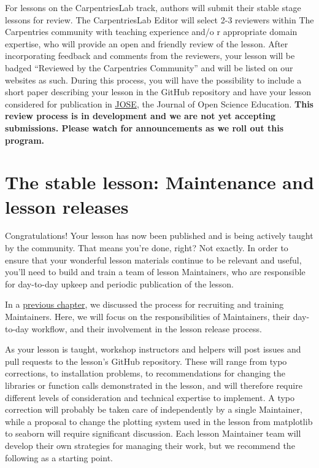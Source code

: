 \documentclass[]{book}
\begin{document}
For lessons on the CarpentriesLab track, authors will submit their stable stage lessons for review.
The CarpentriesLab Editor will select 2-3 reviewers within The Carpentries community with teaching experience and/o
r appropriate domain expertise, who will provide an open and friendly review of the lesson.
After incorporating feedback and comments from the reviewers, your lesson will be badged
``Reviewed by the Carpentries Community'' and will be listed on our websites as such. During this process,
you will have the possibility to include a short paper describing your
lesson in the GitHub repository and have your lesson considered for publication in
\href{http://jose.theoj.org/}{JOSE}, the Journal of Open Science Education.
\textbf{This review process is in development and we are not yet accepting submissions. Please watch for
announcements as we roll out this program.}

\hypertarget{the-stable-lesson-maintenance-and-lesson-releases}{%
\section{The stable lesson: Maintenance and lesson releases}\label{the-stable-lesson-maintenance-and-lesson-releases}}

Congratulations! Your lesson has now been published and is being actively taught by the community.
That means you're done, right? Not exactly. In order to ensure that your wonderful lesson materials
continue to be relevant and useful, you'll need to build and train a team of lesson Maintainers, who
are responsible for day-to-day upkeep and periodic publication of the lesson.

In a \href{community-development-roles\#lesson-maintainers}{previous chapter}, we discussed the process for recruiting and training Maintainers. Here, we
will focus on the responsibilities of Maintainers, their day-to-day workflow, and their involvement
in the lesson release process.

As your lesson is taught, workshop instructors and helpers will post issues and pull requests to
the lesson's GitHub repository. These will range from typo corrections, to installation problems,
to recommendations for changing the libraries or function calls demonstrated in the lesson, and will
therefore require different levels of consideration and technical expertise to implement. A typo
correction will probably be taken care of independently by a single Maintainer,
while a proposal to change
the plotting system used in the lesson from matplotlib to seaborn will require significant
discussion. Each lesson Maintainer team will develop their own strategies for managing their work,
but we recommend the following as a starting point.
\end{document}
